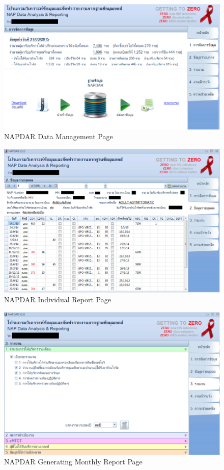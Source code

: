 \FloatBarrier
	\begin{figure}[h!]
        \centering
    		\includegraphics[width=12cm]{images/chapter-01/napdar-01.png}
    		\caption{NAPDAR Data Management Page}
    \end{figure}
\FloatBarrier

\FloatBarrier
	\begin{figure}[h!]
        \centering
    		\includegraphics[width=12cm]{images/chapter-01/napdar-02.png}
    		\caption{NAPDAR Individual Report Page}
    \end{figure}
\FloatBarrier

\FloatBarrier
	\begin{figure}[h!]
        \centering
    		\includegraphics[width=12cm]{images/chapter-01/napdar-03.png}
    		\caption{NAPDAR Generating Monthly Report Page}
    \end{figure}
\FloatBarrier

